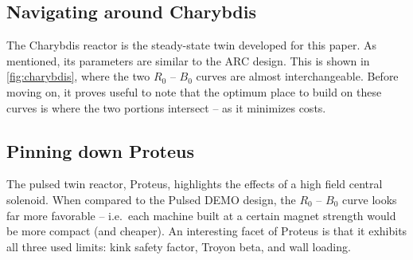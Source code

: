 \begin{table}[b!]
\begin{subtable}[t]{0.5\textwidth}
\begin{tabular}{ c|c }
\end{tabular}
\end{subtable}
\hfill
\hfill
\label{table:proteus}
\end{table}

\clearpage

\newpage

\subsection{Navigating around Charybdis}

The Charybdis reactor is the steady-state twin developed for this paper. As mentioned, its parameters are similar to the ARC design. This is shown in \cref{fig:charybdis}, where the two $R_0$ -- $B_0$ curves are almost interchangeable. Before moving on, it proves useful to note that the optimum place to build on these curves is where the two portions intersect -- as it minimizes costs. 

\subsection{Pinning down Proteus}

The pulsed twin reactor, Proteus, highlights the effects of a high field central solenoid. When compared to the Pulsed DEMO design, the $R_0$ -- $B_0$ curve looks far more favorable -- i.e.\ each machine built at a certain magnet strength would be more compact (and cheaper). An interesting facet of Proteus is that it exhibits all three used limits: kink safety factor, Troyon beta, and wall loading. 

